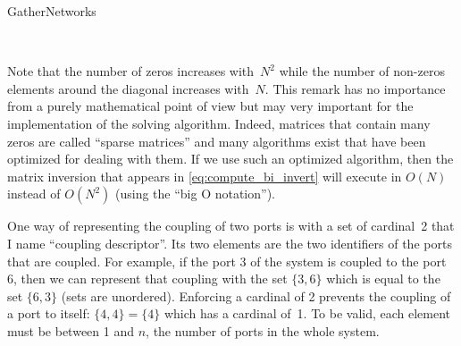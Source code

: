 \begin{algorithm}[hbtp]
    \caption{GatherNetworks}
    \label{algo:gather_networks}
    \begin{algorithmic}
         
         
        \State{}
                
        \EndFor
        \State{}
        \State{}
         
        \EndFor
        \\ 
        \EndFunction
    \end{algorithmic}
\end{algorithm}

Note that the number of zeros increases with~$N^2$ while the number of non-zeros elements around the diagonal increases with~$N$.
This remark has no importance from a purely mathematical point of view but may very important for the implementation of the solving algorithm.
Indeed, matrices that contain many zeros are called ``sparse matrices'' and many algorithms exist that have been optimized for dealing with them.
If we use such an optimized algorithm, then the matrix inversion that appears in \cref{eq:compute_bi_invert} will execute in $O(N)$ instead of $O(N^2)$ (using the ``big O notation'').

One way of representing the coupling of two ports is with a set of cardinal~2 that I name ``coupling descriptor''.
Its two elements are the two identifiers of the ports that are coupled.
For example, if the port 3 of the system is coupled to the port 6, then we can represent that coupling with the set $\lbrace 3, 6\rbrace$ which is equal to the set $\lbrace 6, 3\rbrace$ (sets are unordered).
Enforcing a cardinal of 2 prevents the coupling of a port to itself: $\lbrace 4, 4\rbrace = \lbrace 4\rbrace$ which has a cardinal of~1.
To be valid, each element must be between 1 and $n$, the number of ports in the whole system.

